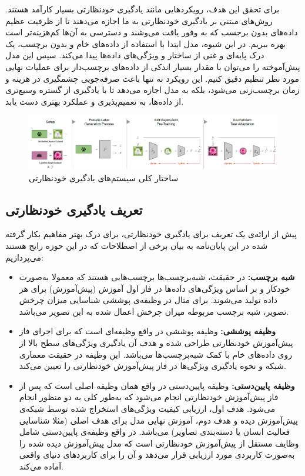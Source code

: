 برای تحقق این هدف، رویکردهایی مانند یادگیری خودنظارتی بسیار کارآمد هستند. روش‌های مبتنی بر یادگیری خودنظارتی به ما اجازه می‌دهند تا از ظرفیت عظیم داده‌های بدون برجسب که به وفور یافت می‌وشند و دسترسی به آن‌ها کم‌هزینه‌تر است بهره ببریم. در این شیوه، مدل ابتدا با استفاده از داده‌های خام و بدون برچسب، یک درک پایه‌ای و غنی از ساختار و ویژگی‌های داده‌ها پیدا می‌کند. سپس این مدل پیش‌آموخته را می‌توان با مقدار بسیار اندکی از داده‌های برچسب‌دار برای عملیات نهایی مورد نظر تنظیم دقیق کنیم. این رویکرد نه تنها باعث صرفه‌جویی چشمگیری در هزینه و زمان برچسب‌زنی می‌شود، بلکه به مدل اجازه می‌دهد تا با یادگیری از گستره وسیع‌تری از داده‌ها، به تعمیم‌پذیری و عملکرد بهتری دست یابد.

\begin{figure}[htbp]
  \centering
  \includegraphics[width=1.0\textwidth]{Images/Chapter2/selfsupervised-overview.png}
  \caption{ساختار کلی سیستم‌های یادگیری خودنظارتی}
  \label{fig:selfsupervised-overview}
\end{figure}

\subsection{تعریف یادگیری خودنظارتی}

پیش از ارائه‌ی یک تعریف برای یادگیری خودنظارتی، برای درک بهتر مفاهیم بکار گرفته شده در این پایان‌نامه به بیان برخی از اصطلاحات که در این حوزه رایج هستند می‌پردازیم:

\begin{itemize}
    \item \textbf{شبه برچسب:}
    در حقیقت، شبه‌برچسب‌ها برچسب‌هایی هستند که معمولا به‌صورت خودکار و بر اساس ویژگی‌های داده‌ها در فاز اول آموزش (پیش‌آموزش) برای هر داده تولید می‌شوند. برای مثال در وظیفه‌ی پوششی شناسایی میزان چرخش تصویر، شبه برچسب مربوطه میزان چرخش اعمال شده به این تصویر می‌باشد.
    \item \textbf{وظیفه پوششی:}
    وظیفه پوششی در واقع وظیفه‌ای است که برای اجرای فاز پیش‌آموزش خودنظارتی طراحی شده و هدف آن یادگیری ویژگی‌های سطح بالا از روی داده‌های خام با کمک شبه‌برچسب‌ها می‌باشد. این وظیفه در حقیقت معماری شبکه و نحوه یادگیری ویژگی‌ها در فاز پیش‌آموزش خودنظارتی را تعیین می‌کند.
    \item \textbf{وظیفه پایین‌دستی:}
    وظیفه پایین‌دستی در واقع همان وظیفه اصلی است که پس از فاز پیش‌آموزش خودنظارتی انجام می‌شود که به‌طور کلی به دو منظور انجام می‌شود. هدف اول، ارزیابی کیفیت ویژگی‌های استخراج شده توسط شبکه‌ی پیش‌آموزش دیده و هدف دوم، آموزش نهایی مدل برای هدف اصلی (مثلا شناسایی فعالیت انسان یا دسته‌بندی تصاویر) می‌باشد. در واقع وظیفه‌ی پایین‌دستی شامل وظایف مستقل از پیش‌آموزش خودنظارتی است که مدل پیش‌آموزش دیده شده را به‌صورت کاربردی مورد ارزیابی قرار می‌دهد و آن را برای کاربردهای دنیای واقعی آماده می‌کند.
\end{itemize}

